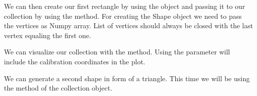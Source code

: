 \documentclass[letterpaper,10pt,english,openany,oneside]{sphinxmanual}
\begin{document}
\sphinxAtStartPar
We can then create our first rectangle by using the {\hyperref[\detokenize{pages/modules:lmd.lib.Shape}]{}} object and passing it to our collection by using the {\hyperref[\detokenize{pages/modules:lmd.lib.Collection.add_shape}]{}} method. For creating the Shape object we need to pass the vertices as Numpy array. List of vertices should always be closed with the last vertex equaling the first one.

\begin{sphinxVerbatim}[commandchars=\\\{\}]
  \PYG{p}{[}\PYG{p}{[}\PYG{p}{]}
                                  \PYG{p}{[}\PYG{p}{]}
                                  \PYG{p}{[}\PYG{p}{]}
                                  \PYG{p}{[}\PYG{p}{]}
                                  \PYG{p}{[}\PYG{p}{]}\PYG{p}{]}
  
\end{sphinxVerbatim}

\sphinxAtStartPar
We can visualize our collection with the {\hyperref[\detokenize{pages/modules:lmd.lib.Collection.plot}]{}} method. Using the  parameter will include the calibration coordinates in the plot.

\begin{sphinxVerbatim}[commandchars=\\\{\}]
  
\end{sphinxVerbatim}

\noindent{}

\sphinxAtStartPar
We can generate a second shape in form of a triangle. This time we will be using the {\hyperref[\detokenize{pages/modules:lmd.lib.Collection.new_shape}]{}} method of the collection object.
\end{document}
